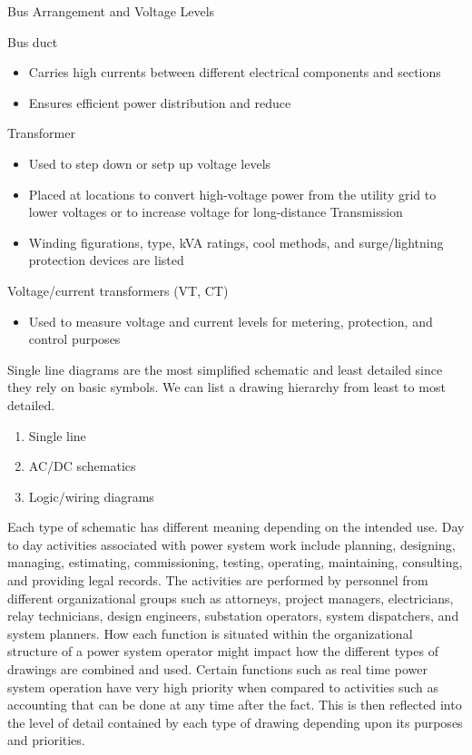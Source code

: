 Bus Arrangement and Voltage Levels
\begin{define}
    Bus duct  
    \begin{itemize}
        \item Carries high currents between different electrical components and sections
        \item Ensures efficient power distribution and reduce
    \end{itemize}
    Transformer 
    \begin{itemize}
        \item Used to step down or setp up voltage levels
        \item Placed at locations to convert high-voltage power from the utility grid to lower voltages or to increase voltage for long-distance Transmission
        \item Winding figurations, type, kVA ratings, cool methods, and surge/lightning protection devices are listed
    \end{itemize}
    Voltage/current transformers (VT, CT)
    \begin{itemize}
        \item Used to measure voltage and current levels for metering, protection, and control purposes
    \end{itemize}
\end{define}

Single line diagrams are the most simplified schematic and least detailed since they rely on basic symbols. We can list a drawing hierarchy from least to most detailed.
\begin{enumerate}
    \item Single line
    \item AC/DC schematics
    \item Logic/wiring diagrams
\end{enumerate}
Each type of schematic has different meaning depending on the intended use. 
Day to day activities associated with power system work include planning, designing, managing, estimating, commissioning, testing, operating, maintaining, consulting, and providing legal records. 
The activities are performed by personnel from different organizational groups such as attorneys, project managers, electricians, relay technicians, design engineers, substation operators, system dispatchers, and system planners. 
How each function is situated within the organizational structure of a power system operator might impact how the different types of drawings are combined and used. 
Certain functions such as real time power system operation have very high priority when compared to activities such as accounting that can be done at any time after the fact. 
This is then reflected into the level of detail contained by each type of drawing depending upon its purposes and priorities.

